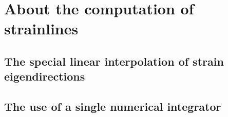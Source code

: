 \section{About the computation of strainlines}
\label{sec:about_the_computation_of_strainlines}

\subsection{The special linear interpolation of strain eigendirections}
\label{sub:the_special_linear_interpolation_of_strain_eigendirections}

\subsection{The use of a single numerical integrator}
\label{sub:the_use_of_a_single_numerical_integrator}




